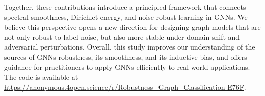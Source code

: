 Together, these contributions introduce a principled framework that connects spectral smoothness, Dirichlet energy, and noise robust learning in GNNs. We believe this perspective opens a new direction for designing graph models that are not only robust to label noise, but also more stable under domain shift and adversarial perturbations.
Overall, this study improves our understanding of the sources of GNNs robustness, its smoothness, and its inductive bias, and offers guidance for practitioners to apply GNNs efficiently to real world applications. The code is available at \url{https://anonymous.4open.science/r/Robustness_Graph_Classification-E76F}.